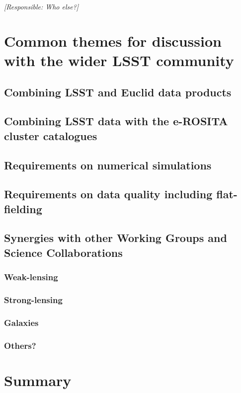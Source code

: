 \documentclass[a4paper,11pt]{article}
\begin{document}
{\it [Responsible: Who else?]}

\section{Common themes for discussion with the wider LSST community}

\subsection{Combining LSST and Euclid data products}

\subsection{Combining LSST data with the e-ROSITA cluster catalogues}

\subsection{Requirements on numerical simulations}

\subsection{Requirements on data quality including flat-fielding}

\subsection{Synergies with other Working Groups and Science Collaborations}

\subsubsection{Weak-lensing}

\subsubsection{Strong-lensing}

\subsubsection{Galaxies}

\subsubsection{Others?}

\section{Summary}
\end{document}

